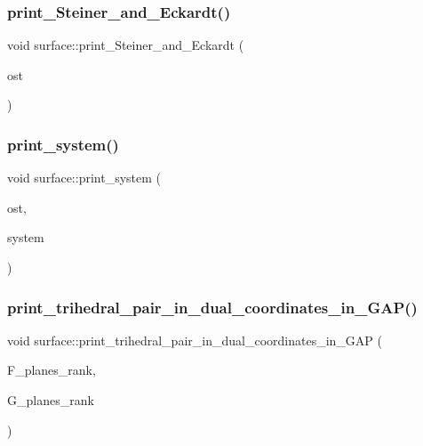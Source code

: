 \mbox{\label{classsurface_ab67446d49aa095b11b6aac17091a846f}} 
\subsubsection{\texorpdfstring{print\+\_\+\+Steiner\+\_\+and\+\_\+\+Eckardt()}{print\_Steiner\_and\_Eckardt()}}
{\footnotesize\ttfamily void surface\+::print\+\_\+\+Steiner\+\_\+and\+\_\+\+Eckardt (\begin{DoxyParamCaption}\item[{ostream \&}]{ost }\end{DoxyParamCaption})}

\mbox{\label{classsurface_a179752dc9ab8fed4cad7efe79fa5aa09}} 
\subsubsection{\texorpdfstring{print\+\_\+system()}{print\_system()}}
{\footnotesize\ttfamily void surface\+::print\+\_\+system (\begin{DoxyParamCaption}\item[{ostream \&}]{ost,  }\item[{\mbox{\hyperlink{galois_8h_a09fddde158a3a20bd2dcadb609de11dc}{I\+NT}} $\ast$}]{system }\end{DoxyParamCaption})}

\mbox{\label{classsurface_a8cb36b5098a585e239fe65f93b60e961}} 
\subsubsection{\texorpdfstring{print\+\_\+trihedral\+\_\+pair\+\_\+in\+\_\+dual\+\_\+coordinates\+\_\+in\+\_\+\+G\+A\+P()}{print\_trihedral\_pair\_in\_dual\_coordinates\_in\_GAP()}}
{\footnotesize\ttfamily void surface\+::print\+\_\+trihedral\+\_\+pair\+\_\+in\+\_\+dual\+\_\+coordinates\+\_\+in\+\_\+\+G\+AP (\begin{DoxyParamCaption}\item[{\mbox{\hyperlink{galois_8h_a09fddde158a3a20bd2dcadb609de11dc}{I\+NT}} $\ast$}]{F\+\_\+planes\+\_\+rank,  }\item[{\mbox{\hyperlink{galois_8h_a09fddde158a3a20bd2dcadb609de11dc}{I\+NT}} $\ast$}]{G\+\_\+planes\+\_\+rank }\end{DoxyParamCaption})}

